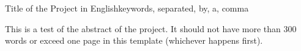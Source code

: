 
\begin{theabstract}{Title of the Project in English}{keywords, separated, by, a, comma}

This is a test of the abstract of the project. It should not have more than 300 words or exceed one page in this template (whichever happens first).

\lipsum[1-2]

\end{theabstract}

